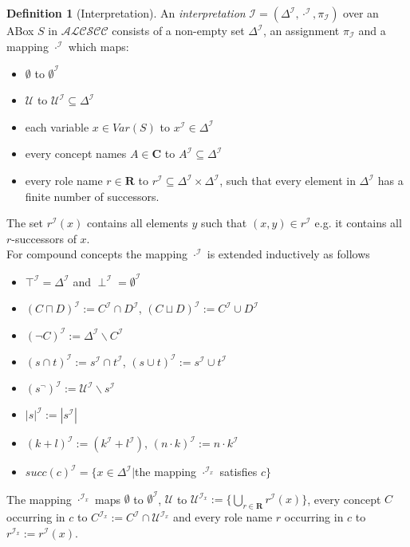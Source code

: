 \documentclass[a4paper,11pt]{scrartcl}
\theoremstyle{break}
\theoremstyle{definition}
\newtheorem{mydef}{Definition}
\begin{document}
\begin{mydef}[Interpretation]
An \textit{interpretation} $\mathcal{I}=(\Delta^\mathcal{I},\cdot^\mathcal{I},\pi_\mathcal{I})$ over an ABox $S$ in $\mathcal{ALCSCC}$ consists of a non-empty set $\Delta^\mathcal{I}$, an assignment $\pi_\mathcal{I}$ and a mapping $\cdot^\mathcal{I}$ which maps:
\begin{itemize}
\item $\emptyset$ to $\emptyset^\mathcal{I}$
\item $\mathcal{U}$ to $\mathcal{U}^\mathcal{I}\subseteq \Delta^\mathcal{I}$
\item each variable $x\in Var(S)$ to $x^\mathcal{I}\in \Delta^\mathcal{I}$
\item every concept names $A\in\mathbf{C}$ to $A^\mathcal{I}\subseteq \Delta^\mathcal{I}$
\item every role name $r\in\mathbf{R}$ to $r^\mathcal{I}\subseteq\Delta^\mathcal{I}\times\Delta^\mathcal{I}$, such that every element in $\Delta^\mathcal{I}$ has a finite number of successors.
\end{itemize}
The set $r^\mathcal{I}(x)$ contains all elements $y$ such that $(x,y)\in r^\mathcal{I}$ e.g. it contains all $r$-successors of $x$.\\
For compound concepts the mapping $\cdot^\mathcal{I}$ is extended inductively as follows
\begin{itemize}
\item $\top^\mathcal{I}=\Delta^\mathcal{I}$ and $\perp^\mathcal{I}=\emptyset^\mathcal{I}$
\item $(C\sqcap D)^\mathcal{I}:=C^\mathcal{I}\cap D^\mathcal{I}$, $(C\sqcup D)^\mathcal{I}:=C^\mathcal{I}\cup D^\mathcal{I}$
\item $(\neg C)^\mathcal{I}:=\Delta^\mathcal{I}\backslash C^\mathcal{I}$
\item $(s\cap t)^\mathcal{I}:= s^\mathcal{I}\cap t^\mathcal{I}$, $(s\cup t)^\mathcal{I}:= s^\mathcal{I}\cup t^\mathcal{I}$
\item $(s^\neg)^\mathcal{I}:=\mathcal{U}^\mathcal{I}\backslash s^\mathcal{I}$
\item $|s|^\mathcal{I}:=|s^\mathcal{I}|$
\item $(k+l)^\mathcal{I}:=(k^\mathcal{I}+l^\mathcal{I})$, $(n\cdot k)^\mathcal{I}:= n\cdot k^\mathcal{I}$
\item $succ(c)^\mathcal{I}=\{x\in \Delta^\mathcal{I}|$the mapping $\cdot^{\mathcal{I}_x}$ satisfies $c\}$
\end{itemize}
The mapping $\cdot^{\mathcal{I}_x}$ maps $\emptyset$ to $\emptyset^\mathcal{I}$, $\mathcal{U}$ to $\mathcal{U}^{\mathcal{I}_x}:=\{\bigcup_{r\in\mathbf{R}}r^\mathcal{I}(x)\}$, every concept $C$ occurring in $c$ to $C^{\mathcal{I}_x}:=C^\mathcal{I}\cap \mathcal{U}^{\mathcal{I}_x}$ and every role name $r$ occurring in $c$ to $r^{\mathcal{I}_x}:=r^\mathcal{I}(x)$.\\

\end{mydef}
\end{document}
